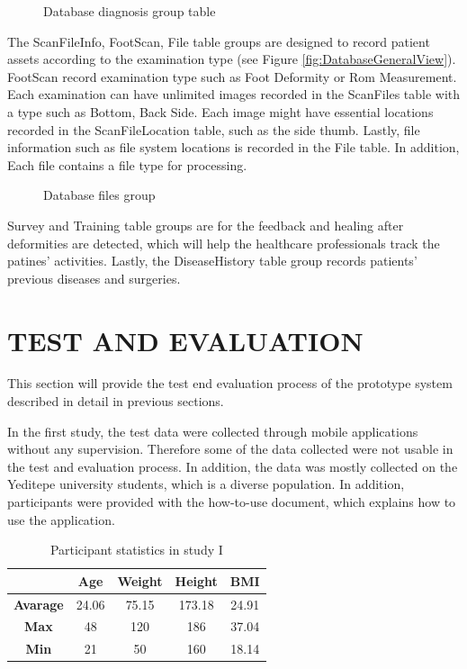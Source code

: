 \begin{figure}[htbp]
\centering
{}
\caption{Database diagnosis group table}
\label{fig:DatabaseDiagnosis}
\end{figure}

The ScanFileInfo, FootScan, File table groups are designed to record patient assets according to the examination type (see Figure \ref{fig:DatabaseGeneralView}). FootScan record examination type such as Foot Deformity or Rom Measurement. Each examination can have unlimited images recorded in the ScanFiles table with a type such as Bottom, Back Side. Each image might have essential locations recorded in the ScanFileLocation table, such as the side thumb. Lastly, file information such as file system locations is recorded in the File table. In addition, Each file contains a file type for processing. 

\begin{figure}[htbp]
\centering
{}
\caption{Database files group}
\label{fig:DatabaseFiles}
\end{figure}

Survey and Training table groups are for the feedback and healing after deformities are detected, which will help the healthcare professionals track the patines' activities. Lastly, the DiseaseHistory table group records patients' previous diseases and surgeries. 

\section{TEST AND EVALUATION} \label{sec:StudyITestAndEvaluation}

This section will provide the test end evaluation process of the prototype system described in detail in previous sections. 

In the first study, the test data were collected through mobile applications without any supervision. Therefore some of the data collected were not usable in the test and evaluation process. In addition, the data was mostly collected on the Yeditepe university students, which is a diverse population. In addition, participants were provided with the how-to-use document, which explains how to use the application. 

\begin{table}[htbp]
\begin{center}
\caption{Participant statistics in study I}
\vspace{23pt}
      \begin{tabular}{|c|c|c|c|c|} \hline
          & \textbf{Age} & \textbf{Weight} & \textbf{Height} & \textbf{BMI} \\ \hline
        \textbf{Avarage} & 24.06 & 75.15 & 173.18 & 24.91 \\ \hline
        \textbf{Max} & 48 & 120 & 186 & 37.04 \\ \hline
        \textbf{Min} & 21 & 50 & 160 & 18.14 \\ \hline
    \end{tabular}
\label{tab:StudyIParticipantStatistics}
\end{center}
\end{table}

